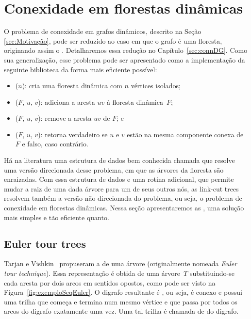 \chapter{Conexidade em florestas dinâmicas}
\label{sec:connDF}

O problema de conexidade em grafos dinâmicos, descrito na Seção \ref{sec:Motivação}, pode ser reduzido ao caso em que o grafo é uma floresta, originando assim o . Detalharemos essa redução no Capítulo~\ref{sec:connDG}. Como sua generalização, esse problema pode ser apresentado como a implementação da seguinte biblioteca da forma mais eficiente possível: 

\begin{itemize}
\item \dymForestCreate($n$): cria uma floresta dinâmica com $n$ vértices isolados;
\item \dymForestAddEdge($F$, $u$, $v$): adiciona a aresta $uv$ à floresta dinâmica~$F$;
\item \dymForestDelEdge($F$, $u$, $v$): remove a aresta $uv$ de $F$; e
\item \dymForestQuery($F$, $u$, $v$): retorna verdadeiro se $u$ e $v$ estão na mesma componente conexa de $F$ e falso, caso contrário.
\end{itemize}
 
Há na literatura uma estrutura de dados bem conhecida chamada  \cite{SleatroTarjanLinkCutTree1983} que resolve uma versão direcionada desse problema, em que as árvores da floresta são enraizadas. Com essa estrutura de dados e uma rotina adicional, que permite mudar a raiz de uma dada árvore para um de seus outros nós, as link-cut trees resolvem também a versão não direcionada do problema, ou seja, o problema de conexidade em florestas dinâmicas. Nessa seção apresentaremos as , uma solução mais simples e tão eficiente quanto.


\section{Euler tour trees} 

Tarjan e Vishkin~\cite{tarjan1985} propuseram a  de uma árvore (originalmente nomeada \textit{Euler tour technique}). Essa representação é obtida de uma árvore~$T$ substituindo-se cada aresta por dois arcos em sentidos opostos, como pode ser visto na Figura~\ref{fig:exemploSeqEuler}. O digrafo resultante é , ou seja, é conexo e possui uma trilha que começa e termina num mesmo vértice e que passa por todos os arcos do digrafo exatamente uma vez. Uma tal trilha é chamada de  do digrafo.



